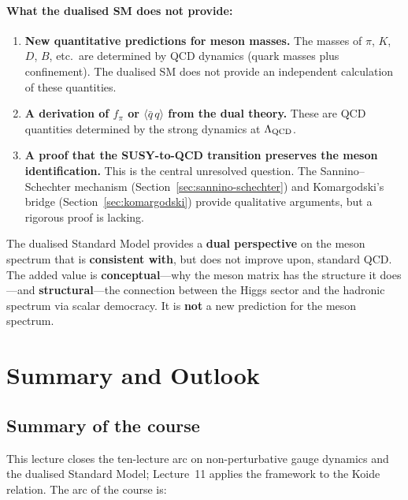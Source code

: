 \documentclass[11pt,a4paper]{article}
\newcommand{\fpi}{f_\pi}
\newcommand{\qqbar}{\langle \bar{q}\,q \rangle}
\begin{document}
\paragraph{What the dualised SM does \textbf{not} provide:}
\begin{enumerate}[label=(\alph*)]
  \item \textbf{New quantitative predictions for meson masses.}
    The masses of $\pi$, $K$, $D$, $B$, etc.\ are determined by QCD
    dynamics (quark masses plus confinement).  The dualised SM does
    not provide an independent calculation of these quantities.
  \item \textbf{A derivation of $\fpi$ or $\qqbar$ from the dual
    theory.}  These are QCD quantities determined by the strong
    dynamics at $\Lambda_{\mathrm{QCD}}$.
  \item \textbf{A proof that the SUSY-to-QCD transition preserves the
    meson identification.}  This is the central unresolved question.
    The Sannino--Schechter mechanism (Section~\ref{sec:sannino-schechter})
    and Komargodski's bridge (Section~\ref{sec:komargodski}) provide
    qualitative arguments, but a rigorous proof is lacking.
\end{enumerate}

\begin{warningbox}[title={Honest framing}]
The dualised Standard Model provides a \textbf{dual perspective} on
the meson spectrum that is \textbf{consistent with}, but does not
improve upon, standard QCD.  The added value is
\textbf{conceptual}---why the meson matrix has the structure it
does---and \textbf{structural}---the connection between the Higgs
sector and the hadronic spectrum via scalar democracy.  It is
\textbf{not} a new prediction for the meson spectrum.
\end{warningbox}


\section{Summary and Outlook}
\label{sec:summary}

\subsection{Summary of the course}

This lecture closes the ten-lecture arc on non-perturbative gauge
dynamics and the dualised Standard Model; Lecture~11 applies the
framework to the Koide relation.  The arc of the course is:
\end{document}
